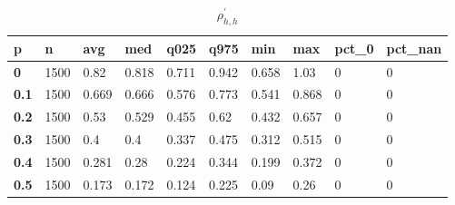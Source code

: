 \begin{table}[h]
 \centering 
\footnotesize
\caption{$\rho_{h,h}^\prime $}
\label{tab:alphahh}
\begin{tabular}[h]{|l|l|l|l|l|l|l|l|l|l|
    } \hline
\textbf{ p} & \textbf{ n} & \textbf{ avg} & \textbf{ med} & \textbf{ q025} & \textbf{ q975} & \textbf{ min} & \textbf{ max} & \textbf{ pct\_0} & \textbf{ pct\_nan}
    \\ \hline
  \textbf{  0} & 1500 &  0.82 & 0.818 & 0.711 & 0.942 & 0.658 &  1.03 & 0 & 0
    \\ \hline
  \textbf{0.1} & 1500 & 0.669 & 0.666 & 0.576 & 0.773 & 0.541 & 0.868 & 0 & 0
    \\ \hline
  \textbf{0.2} & 1500 &  0.53 & 0.529 & 0.455 &  0.62 & 0.432 & 0.657 & 0 & 0
    \\ \hline
  \textbf{0.3} & 1500 &   0.4 &   0.4 & 0.337 & 0.475 & 0.312 & 0.515 & 0 & 0
    \\ \hline
  \textbf{0.4} & 1500 & 0.281 &  0.28 & 0.224 & 0.344 & 0.199 & 0.372 & 0 & 0
    \\ \hline
  \textbf{0.5} & 1500 & 0.173 & 0.172 & 0.124 & 0.225 &  0.09 &  0.26 & 0 & 0
    \\ \hline
 \end{tabular}
 \end{table}
